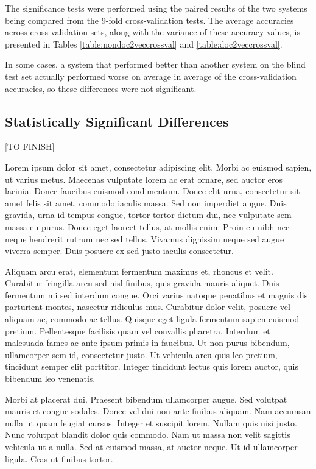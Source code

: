 \documentclass[twocolumn]{article}
\begin{document}
The significance tests were performed using the paired results of the two systems being compared from the 9-fold cross-validation tests. The average accuracies across cross-validation sets, along with the variance of these accuracy values, is presented in Tables \ref{table:nondoc2veccrossval} and \ref{table:doc2veccrossval}.

In some cases, a system that performed better than another system on the blind test set actually performed worse on average in average of the cross-validation accuracies, so these differences were not significant.

\subsection{Statistically Significant Differences}

[TO FINISH]

Lorem ipsum dolor sit amet, consectetur adipiscing elit. Morbi ac euismod sapien, ut varius metus. Maecenas vulputate lorem ac erat ornare, sed auctor eros lacinia. Donec faucibus euismod condimentum. Donec elit urna, consectetur sit amet felis sit amet, commodo iaculis massa. Sed non imperdiet augue. Duis gravida, urna id tempus congue, tortor tortor dictum dui, nec vulputate sem massa eu purus. Donec eget laoreet tellus, at mollis enim. Proin eu nibh nec neque hendrerit rutrum nec sed tellus. Vivamus dignissim neque sed augue viverra semper. Duis posuere ex sed justo iaculis consectetur.

Aliquam arcu erat, elementum fermentum maximus et, rhoncus et velit. Curabitur fringilla arcu sed nisl finibus, quis gravida mauris aliquet. Duis fermentum mi sed interdum congue. Orci varius natoque penatibus et magnis dis parturient montes, nascetur ridiculus mus. Curabitur dolor velit, posuere vel aliquam ac, commodo ac tellus. Quisque eget ligula fermentum sapien euismod pretium. Pellentesque facilisis quam vel convallis pharetra. Interdum et malesuada fames ac ante ipsum primis in faucibus. Ut non purus bibendum, ullamcorper sem id, consectetur justo. Ut vehicula arcu quis leo pretium, tincidunt semper elit porttitor. Integer tincidunt lectus quis lorem auctor, quis bibendum leo venenatis.

Morbi at placerat dui. Praesent bibendum ullamcorper augue. Sed volutpat mauris et congue sodales. Donec vel dui non ante finibus aliquam. Nam accumsan nulla ut quam feugiat cursus. Integer et suscipit lorem. Nullam quis nisi justo. Nunc volutpat blandit dolor quis commodo. Nam ut massa non velit sagittis vehicula ut a nulla. Sed at euismod massa, at auctor neque. Ut id ullamcorper ligula. Cras ut finibus tortor.
\end{document}
